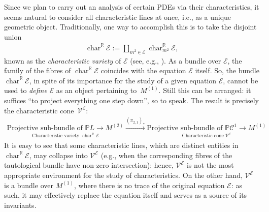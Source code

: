 \documentclass[pdftex]{sigma}
\newcommand{\R}{\mathbb{R}}
\newcommand{\C}{\mathcal{C}}
\newcommand{\M}{\mathcal{V}}
\newcommand{\E}{\mathcal{E}}
\newcommand{\V}{{\mathcal{V}}}
\renewcommand{\P}{\mathbb{P}}
\newcommand{\Char}[1]{\operatorname{char}^\R_{#1}}
\numberwithin{equation}{section}
\begin{document}
Since we plan to carry out an analysis of certain PDEs via their characteristics, it seems na\-tural to consider all characteristic lines at once, i.e., as a unique geometric object. Traditionally, one way to accomplish this is to take the disjoint union
\begin{gather*}
\Char{}{\E}:=\coprod_{m^2\in\E}\Char{m^2}{\E},%
\end{gather*}
 known as the \emph{characteristic variety} of $\E$ (see, e.g., \cite{MR1083148}). As a bundle over $\E$, the family of the f\/ibres of $\Char{}{\E}$ coincides with the equation $\E$ itself. So, the bundle $\Char{}{\E}$, in spite of its importance for the study of a given equation $\E$, cannot be used to \emph{define} $\E$ as an object pertaining to~$M^{(1)}$. Still this can be arranged: it suf\/f\/ices ``to project everything one step down'', so to speak. The result is precisely the characteristic cone~$\V^\E$:
 \begin{gather}\label{eq.char.cone.2}
\underset{\textrm{Characteristic variety }\Char{}{\E}}{\boxed{\textrm{Projective sub-bundle of }\P L\to M^{(2)}}}\stackrel{(\pi_{2,1})_\ast}{\longrightarrow}\underset{\textrm{Characteristic cone }\M^{\E}}{\boxed{\textrm{Projective sub-bundle of }\P \C^1\to M^{(1)}}}\!\!\!
\end{gather}
It is easy to see that some characteristic lines, which are distinct entities in $\Char{}{\E}$, may collapse into $\M^{\E}$ (e.g., when the corresponding f\/ibres of the tautological bundle have non-zero intersection): hence, $\M^{\E}$ is not the most appropriate environment for the study of characteristics. On the other hand, $\M^{\E}$ is a bundle over $ M^{(1)}$, where there is no trace of the original equation $\E$: as such, it may ef\/fectively replace the equation itself and serves as a source of its invariants.
\end{document}
